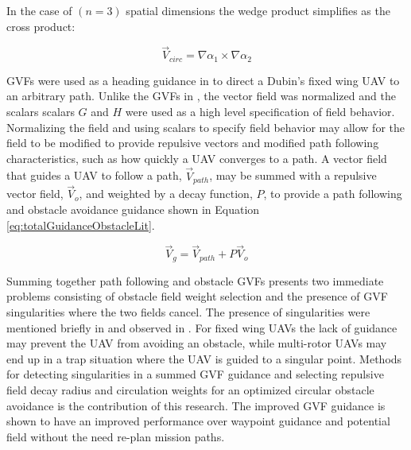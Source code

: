 \documentclass[conf]{new-aiaa}
\begin{document}
\noindent
In the case of $(n=3)$ spatial dimensions the wedge product simplifies as the cross product:

\begin{equation}
\overrightarrow{V}_{circ} =  \nabla\alpha_1 \times \nabla\alpha_2 
\label{circOnlySimp}
\end{equation}


GVFs were used as a heading guidance in \cite{gerlach_autonomous_2014} to direct a Dubin's fixed wing UAV to an arbitrary path. Unlike the GVFs in \cite{goncalves_artificial_2009,goncalves_circulation_2010,goncalves_vector_2010}, the vector field was normalized and the scalars scalars $G$ and $H$ were used as a high level specification of field behavior. Normalizing the field and using scalars to specify field behavior may allow for the field to be modified to provide repulsive vectors and modified path following characteristics, such as how quickly a UAV converges to a path. A vector field that guides a UAV to follow a path, $\overrightarrow{V}_{path}$, may be summed with a repulsive vector field, $\overrightarrow{V}_o$, and weighted by a decay function, $P$, to provide a path following and obstacle avoidance guidance shown in Equation \ref{eq:totalGuidanceObstacleLit}.

\begin{equation}
\label{eq:totalGuidanceObstacleLit}
\overrightarrow{V}_g = \overrightarrow{V}_{path} + P\overrightarrow{V}_{o}
\end{equation}

Summing together path following and obstacle GVFs presents two immediate problems consisting of obstacle field weight selection and the presence of GVF singularities where the two fields cancel. The presence of singularities were mentioned briefly in \cite{nelson_cooperative_2005} and observed in \cite{panagou_motion_2014}. For fixed wing UAVs the lack of guidance may prevent the UAV from avoiding an obstacle, while multi-rotor UAVs may end up in a trap situation where the UAV is guided to a singular point. Methods for detecting singularities in a summed GVF guidance and selecting repulsive field decay radius and circulation weights for an optimized circular obstacle avoidance is the contribution of this research. The improved GVF guidance is shown to have an improved performance over waypoint guidance and potential field without the need re-plan mission paths. 
\end{document}
